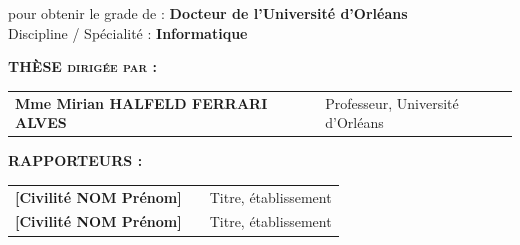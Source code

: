 {\begin{sffamily}
\vspace{0.3cm}
	
\begin{minipage}{\textwidth}
\centering\large
pour obtenir le grade de : \textbf{Docteur de l'Université d'Orléans \\ \vspace{0.3cm}}
Discipline / Spécialité : \textbf{Informatique}
\end{minipage}
	
\vspace{0.3cm}


\vspace{0.3cm}
\large
\textsc{\textbf{THÈSE dirigée par : }}\vspace*{2mm}\\ 
\begin{tabular}{l p{2cm} p{8cm}}
\textbf{Mme Mirian HALFELD FERRARI ALVES} & $\ $ & Professeur, Université d'Orléans\\
\end{tabular}

\vspace{0.3cm}

\textsc{\textbf{RAPPORTEURS :}}\vspace*{2mm}\\
\begin{tabular}{l p{2cm} p{8cm}}
\textbf{[Civilité NOM Prénom]} &  &  Titre, établissement\\
\textbf{[Civilité NOM Prénom]} &  &  Titre, établissement\\
\end{tabular}

\hrulefill

\vspace{0.3cm}


\end{sffamily}}
